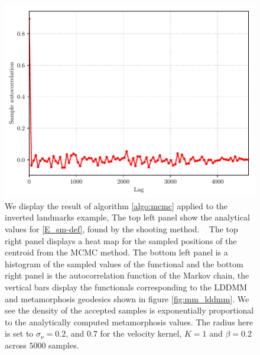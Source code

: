 \documentclass[runningheads]{llncs}
\begin{document}
\begin{figure}[h!]
\begin{minipage}{\textwidth}
    \includegraphics[scale=.33]{autocorrelation_criss_cross.pdf}
    \caption{\footnotesize We display the result of algorithm \ref{algo:mcmc} applied to the
    inverted landmarks example, The top left panel show the analytical values
    for \eqref{E_sm-def}, found by the shooting method.   The top right panel
    displays a heat map for the sampled positions of the centroid from the MCMC
    method. The bottom left panel is a histogram of the sampled values of the
    functional and the bottom right panel is the autocorrelation function of the
    Markov chain, the vertical bars display the functionals corresponding to the
    LDDMM and metamorphosis geodesics shown in figure \ref{fig:mm_lddmm}. We see
    the density of the accepted samples is exponentially proportional to the
    analytically computed metamorphosis values. The radius here is set to
    $\sigma_\nu = 0.2$, and $0.7$ for the velocity kernel, $K=1$ and $\beta=0.2$
    across $5000$ samples.}
    \label{fig:selective:crisscross}
\end{minipage}
\end{figure}
\end{document}
